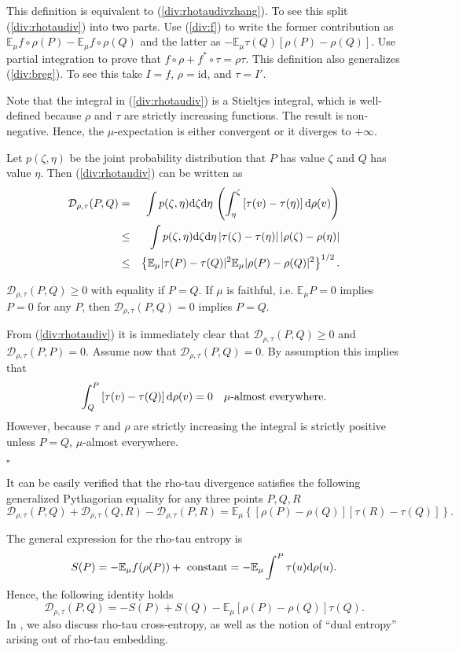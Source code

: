 \documentclass[graybox]{svmult}
\newcommand{\be}{\begin{equation}}
\newcommand{\ee}{\end{equation}}
\newcommand{\beq}{\begin{eqnarray}}
\newcommand{\eeq}{\end{eqnarray}}
\newcommand{\id}{\mbox{id}}
\newcommand{\Eo}{\mathbb E}
\newcommand{\Ddiv}{\mathcal{D}}
\newcommand{\beginproof}{\par\strut\vskip 0.0cm\noindent{\bf Proof}\par}
\renewcommand{\endproof}{\par\strut\hfill$\square$\par\vskip 0.2cm}
\newcommand{\upd}{{\rm d}}
\begin{document}
This definition is equivalent to (\ref  {div:rhotaudivzhang}). To see this split (\ref {div:rhotaudiv})
into two parts.
Use (\ref {div:f}) to write the former contribution as $\Eo_\mu f\circ\rho(P)-\Eo_\mu f\circ\rho(Q)$
and the latter as $-\Eo_\mu\tau(Q)[\rho(P)-\rho(Q)]$. Use partial integration to prove
that $f\circ\rho+f^*\circ\tau=\rho\tau$.
%
This definition also generalizes (\ref {div:breg}). To see this take $I=f$, $\rho=\id$, and $\tau=I'$.

Note that the integral in (\ref {div:rhotaudiv}) is a Stieltjes integral, which is well-defined because $\rho$ and $\tau$
are strictly increasing functions. The result is non-negative. Hence, the $\mu$-expectation
is either convergent or it diverges to $+\infty$.

Let $p(\zeta,\eta)$ be the joint probability distribution 
that $P$ has value $\zeta$ and $Q$ has value $\eta$.
Then (\ref {div:rhotaudiv}) can be written as
\beq
\Ddiv _{\rho,\tau}(P,Q)&=&\int p(\zeta,\eta)\upd\zeta\upd\eta\,
\left(\int_\eta^\zeta\left[\tau(v)-\tau(\eta)\right]\upd \rho(v)\right)\cr
&\le&
\int p(\zeta,\eta)\upd\zeta\upd\eta\,|\tau(\zeta)-\tau(\eta)|\,|\rho(\zeta)-\rho(\eta)|\cr
&\le&\left\{\Eo_\mu |\tau(P)-\tau(Q)|^2\Eo_\mu|\rho(P)-\rho(Q)|^2\right\}^{1/2}.
\eeq

\begin{theorem}
$\Ddiv _{\rho,\tau}(P,Q)\ge 0$ with equality if $P=Q$.
If $\mu$ is faithful, i.e. $\Eo_\mu P=0$ implies $P=0$ for any $P$, then
$\Ddiv _{\rho,\tau}(P,Q)=0$ implies $P=Q$.
\end{theorem}

\beginproof

From (\ref {div:rhotaudiv}) it is immediately clear that $\Ddiv _{\rho,\tau}(P,Q)\ge 0$
and $\Ddiv _{\rho,\tau}(P,P)=0$.
Assume now that $\Ddiv _{\rho,\tau}(P,Q)=0$. 
By assumption this implies that
\be
\int_Q^P\left[\tau(v)-\tau(Q)\right]\upd \rho(v)=0\quad\mu\mbox{-almost everywhere}.
\nonumber
\ee
However, because $\tau$ and $\rho$ are strictly increasing the integral is strictly positive unless
$P=Q$, $\mu$-almost everywhere.
\endproof

It can be easily verified that the rho-tau divergence satisfies the following generalized Pythagorian equality for any three points $P,Q,R$
$$
\Ddiv _{\rho,\tau}(P,Q) + \Ddiv _{\rho,\tau}(Q,R) - \Ddiv _{\rho,\tau}(P,R) = \Eo_\mu \left\{ [\rho(P) - \rho(Q)] [ \tau(R) - \tau(Q)]    \right\} .
$$

The general expression for the rho-tau entropy is
\be
S(P)=-\Eo_\mu f(\rho(P))+\mbox{ constant}
=-\Eo_\mu\int^P\tau(u)\upd\rho(u).
\ee
Hence, the following identity holds
\be
\Ddiv _{\rho,\tau}(P,Q)=
-S(P)+S(Q)-\Eo_\mu\left[\rho(P)-\rho(Q)\right]\tau(Q).
\label{div:ent}
\ee
In \cite{ZN17, NZ18}, we also discuss rho-tau cross-entropy, as well as the notion of ``dual entropy'' arising out of rho-tau embedding. 
\end{document}
